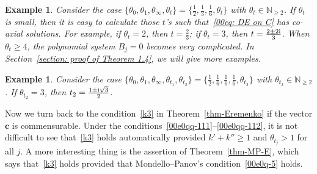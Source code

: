 \documentclass[pdftex]{sigma}
\numberwithin{equation}{section}
\newtheorem{Example}[Theorem]{Example}
\begin{document}
\begin{Example}
Consider the case
$\{\theta_0,\theta_1,\theta_\infty,\theta_t\}
=\bigl\{\frac12,\frac13,\frac16,\theta_t\bigr\}$
with $\theta_t\in\mathbb{N}_{\geq 2}$. If $\theta_t$ is small, then it
is easy to calculate those $t$'s such that~\eqref{00eq: DE on C} has
co-axial solutions. For example, if $\theta_t=2$, then $t=\frac23$; if
$\theta_t=3$, then $t=\frac{2\pm 2 {\rm i}}{3}$. When $\theta_t\geq 4$, the
polynomial system $B_j=0$ becomes very complicated. In Section~\ref{section: proof of Theorem 1.4}, we will give more examples.
\end{Example}

\begin{Example}
Consider the case $\{\theta_0,\theta_1,\theta_\infty,\theta_{t_1},\theta_{t_2}\}=\bigl\{\frac12,\frac16,\frac16,\frac16,\theta_{t_2}\bigr\}$ with $\theta_{t_2}\in\mathbb{N}_{\geq 2}$. If $\theta_{t_2}=3$, then $t_2=\frac{1\pm {\rm i}\sqrt{3}}{2}$.
\end{Example}

Now we turn back to the condition~\eqref{k3} in Theorem~\ref{thm-Eremenko} if the vector $\boldsymbol c$ is commensurable. Under the conditions~\eqref{00e0qq-111}--\eqref{00e0qq-112}, it is not difficult to see that~\eqref{k3} holds automatically provided $k'+k''\geq 1$ and $\theta_{t_j}>1$ for all $j$. A more interesting thing is the assertion of Theorem~\ref{thm-MP-E}, which says that~\eqref{k3} holds provided that Mondello--Panov's condition~\eqref{00e0q-5} holds.
\end{document}
